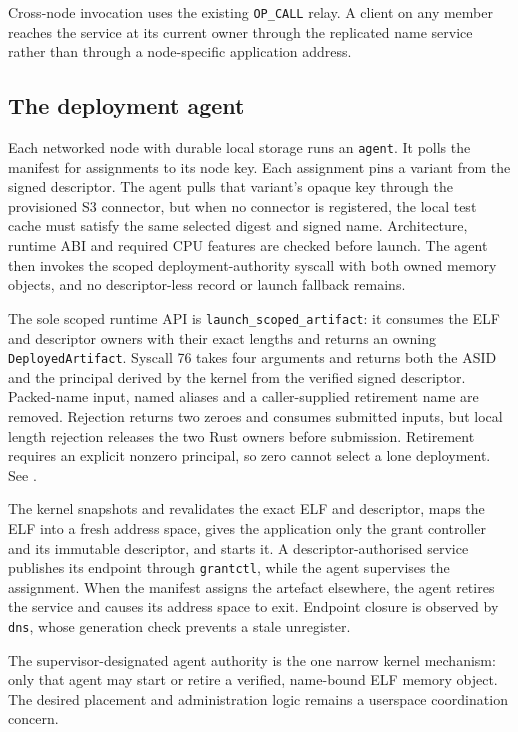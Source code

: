 Cross-node invocation uses the existing \texttt{OP\_CALL} relay. A client on
any member reaches the service at its current owner through the replicated
name service rather than through a node-specific application address.

\subsection{The deployment agent}

Each networked node with durable local storage runs an \texttt{agent}. It polls
the manifest for assignments to its node key. Each assignment pins a variant
from the signed descriptor. The agent pulls that variant's opaque key through
the provisioned S3 connector, but when no connector is registered, the local test
cache must satisfy the same selected digest and signed name. Architecture,
runtime ABI and required CPU features are checked before launch. The agent
then invokes the scoped deployment-authority syscall with both owned memory
objects, and no descriptor-less record or launch fallback remains.

The sole scoped runtime API is \texttt{launch\_scoped\_artifact}: it consumes
the ELF and descriptor owners with their exact lengths and returns an owning
\texttt{DeployedArtifact}. Syscall 76 takes four arguments and returns both
the ASID and the principal derived by the kernel from the verified signed
descriptor. Packed-name input, named aliases and a caller-supplied retirement
name are removed. Rejection returns two zeroes and consumes submitted inputs, but
local length rejection releases the two Rust owners before submission.
Retirement requires an explicit nonzero principal, so zero cannot select a lone
deployment. See .

The kernel snapshots and revalidates the exact ELF and descriptor, maps the
ELF into a fresh address space, gives the application only the grant controller
and its immutable descriptor, and starts it. A descriptor-authorised service
publishes its endpoint through \texttt{grantctl}, while the agent supervises the
assignment. When the manifest assigns the artefact elsewhere, the agent
retires the service and causes its address space to exit. Endpoint closure is
observed by \texttt{dns}, whose generation check prevents a stale unregister.

The supervisor-designated agent authority is the one narrow kernel mechanism:
only that agent may start or retire a verified, name-bound ELF memory
object. The desired placement and administration logic remains a userspace
coordination concern.

